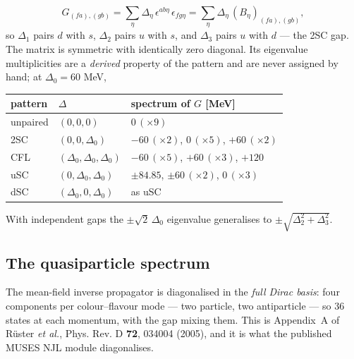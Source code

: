 \documentclass[aps,prc,onecolumn,superscriptaddress,nofootinbib,10pt]{revtex4-2}
\begin{document}
\begin{equation}
  G_{(fa),(gb)} = \sum_\eta \Delta_\eta\, \epsilon^{ab\eta}\,\epsilon_{fg\eta}
                = \sum_\eta \Delta_\eta\, (B_\eta)_{(fa),(gb)} ,
  \label{eq:G}
\end{equation}
so $\Delta_1$ pairs $d$ with $s$, $\Delta_2$ pairs $u$ with $s$, and
$\Delta_3$ pairs $u$ with $d$ --- the 2SC gap. The matrix is symmetric with
identically zero diagonal. Its eigenvalue multiplicities are a \emph{derived}
property of the pattern and are never assigned by hand; at $\Delta_0 = 60$ MeV,

\begin{center}
\begin{tabular}{lll}
\toprule
pattern & $\Delta$ & spectrum of $G$ [MeV] \\
\midrule
unpaired & $(0,0,0)$ & $0\,(\times 9)$ \\
2SC & $(0,0,\Delta_0)$ & $-60\,(\times2)$, $0\,(\times5)$, $+60\,(\times2)$ \\
CFL & $(\Delta_0,\Delta_0,\Delta_0)$ & $-60\,(\times5)$, $+60\,(\times3)$, $+120$ \\
uSC & $(0,\Delta_0,\Delta_0)$ & $\pm84.85$, $\pm60\,(\times2)$, $0\,(\times3)$ \\
dSC & $(\Delta_0,0,\Delta_0)$ & as uSC \\
\bottomrule
\end{tabular}
\end{center}
With independent gaps the $\pm\sqrt2\,\Delta_0$ eigenvalue generalises to
$\pm\sqrt{\Delta_2^2+\Delta_3^2}$.

\subsection{The quasiparticle spectrum}
\label{sec:bdg}

The mean-field inverse propagator is diagonalised in the \emph{full Dirac
basis}: four components per colour--flavour mode --- two particle, two
antiparticle --- so $36$ states at each momentum, with the gap mixing them.
This is Appendix~A of R\"uster \emph{et al.}, Phys. Rev. D \textbf{72},
034004 (2005), and it is what the published MUSES NJL module diagonalises.
\end{document}
